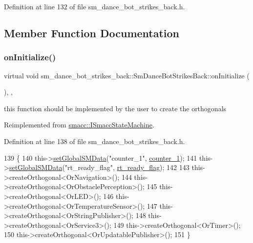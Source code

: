 Definition at line 132 of file sm\+\_\+dance\+\_\+bot\+\_\+strikes\+\_\+back.\+h.



\subsection{Member Function Documentation}
\mbox{\label{structsm__dance__bot__strikes__back_1_1SmDanceBotStrikesBack_ad6a9ef45cc05cb6fed4550f2f04d4a3e}} 
\subsubsection{\texorpdfstring{on\+Initialize()}{onInitialize()}}
{\footnotesize\ttfamily virtual void sm\+\_\+dance\+\_\+bot\+\_\+strikes\+\_\+back\+::\+Sm\+Dance\+Bot\+Strikes\+Back\+::on\+Initialize (\begin{DoxyParamCaption}{ }\end{DoxyParamCaption})\hspace{0.3cm}{\ttfamily [inline]}, {\ttfamily [override]}, {\ttfamily [virtual]}}



this function should be implemented by the user to create the orthogonals 



Reimplemented from \hyperlink{classsmacc_1_1ISmaccStateMachine_ac2982c6c8283663e5e1e8a7c82f511ec}{smacc\+::\+I\+Smacc\+State\+Machine}.



Definition at line 138 of file sm\+\_\+dance\+\_\+bot\+\_\+strikes\+\_\+back.\+h.


\begin{DoxyCode}
139     \{
140         this->\hyperlink{classsmacc_1_1ISmaccStateMachine_a8588f9e580fbb95b53e2bd2ca3ff1f98}{setGlobalSMData}(\textcolor{stringliteral}{"counter\_1"}, \hyperlink{structsm__dance__bot__strikes__back_1_1SmDanceBotStrikesBack_a0cf56e316022dde4b3da552ab9f68513}{counter\_1});
141         this->\hyperlink{classsmacc_1_1ISmaccStateMachine_a8588f9e580fbb95b53e2bd2ca3ff1f98}{setGlobalSMData}(\textcolor{stringliteral}{"rt\_ready\_flag"}, \hyperlink{structsm__dance__bot__strikes__back_1_1SmDanceBotStrikesBack_a609265a94c2575580fbb014f551a066a}{rt\_ready\_flag});
142 
143         this->createOrthogonal<OrNavigation>();
144         this->createOrthogonal<OrObstaclePerception>();
145         this->createOrthogonal<OrLED>();
146         this->createOrthogonal<OrTemperatureSensor>();
147         this->createOrthogonal<OrStringPublisher>();
148         this->createOrthogonal<OrService3>();
149         this->createOrthogonal<OrTimer>();
150         this->createOrthogonal<OrUpdatablePublisher>();
151     \}
\end{DoxyCode}



